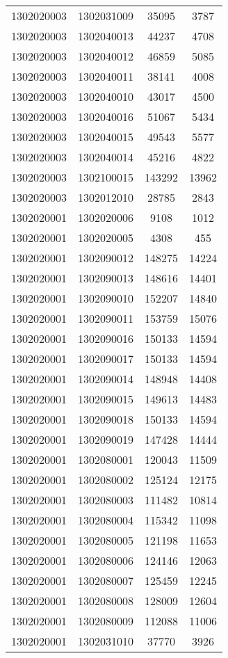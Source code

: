 \begin{longtable}{llcc}
1302020003 & 1302031009 & 35095 & 3787\\
1302020003 & 1302040013 & 44237 & 4708\\
1302020003 & 1302040012 & 46859 & 5085\\
1302020003 & 1302040011 & 38141 & 4008\\
1302020003 & 1302040010 & 43017 & 4500\\
1302020003 & 1302040016 & 51067 & 5434\\
1302020003 & 1302040015 & 49543 & 5577\\
1302020003 & 1302040014 & 45216 & 4822\\
1302020003 & 1302100015 & 143292 & 13962\\
1302020003 & 1302012010 & 28785 & 2843\\
1302020001 & 1302020006 & 9108 & 1012\\
1302020001 & 1302020005 & 4308 & 455\\
1302020001 & 1302090012 & 148275 & 14224\\
1302020001 & 1302090013 & 148616 & 14401\\
1302020001 & 1302090010 & 152207 & 14840\\
1302020001 & 1302090011 & 153759 & 15076\\
1302020001 & 1302090016 & 150133 & 14594\\
1302020001 & 1302090017 & 150133 & 14594\\
1302020001 & 1302090014 & 148948 & 14408\\
1302020001 & 1302090015 & 149613 & 14483\\
1302020001 & 1302090018 & 150133 & 14594\\
1302020001 & 1302090019 & 147428 & 14444\\
1302020001 & 1302080001 & 120043 & 11509\\
1302020001 & 1302080002 & 125124 & 12175\\
1302020001 & 1302080003 & 111482 & 10814\\
1302020001 & 1302080004 & 115342 & 11098\\
1302020001 & 1302080005 & 121198 & 11653\\
1302020001 & 1302080006 & 124146 & 12063\\
1302020001 & 1302080007 & 125459 & 12245\\
1302020001 & 1302080008 & 128009 & 12604\\
1302020001 & 1302080009 & 112088 & 11006\\
1302020001 & 1302031010 & 37770 & 3926\\

\end{longtable}
